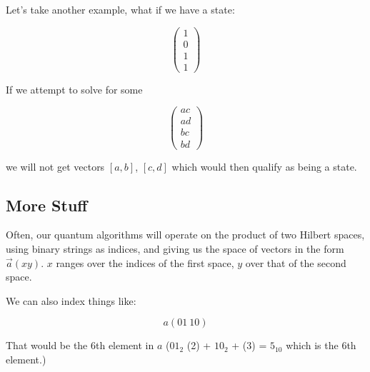 \documentclass[letterpaper]{article}
\begin{document}
Let's take another example, what if we have a state:

\begin{equation}
\begin{pmatrix}
1 \\ 0 \\ 1 \\ 1
\end{pmatrix}
\end{equation}

If we attempt to solve for some 

\begin{equation}
\begin{pmatrix}
ac \\ ad \\ bc \\ bd
\end{pmatrix}
\end{equation}

we will not get vectors \([a,b]\), \([c,d]\) which would then qualify as being a state.

\subsection{More Stuff}
\label{sec:org6ebe683}
Often, our quantum algorithms will operate on the product of two Hilbert spaces, using binary strings as indices, and giving us the space of vectors in the form \(\vec{a}(xy)\). \(x\) ranges over the indices of the first space, \(y\) over that of the second space.

We can also index things like:

\begin{equation}
   a(01\ 10) 
\end{equation}

That would be the 6th element in \(a\) (\(01_2\) (2) + \(10_2\) + (3) = \(5_{10}\) which is the 6th element.)
\end{document}
